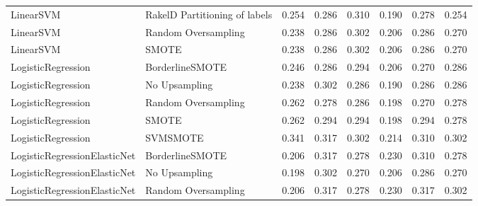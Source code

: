 \begin{tabular}{llllllll}
                      LinearSVM & RakelD Partitioning of labels & 0.254 &                     0.286 &                 0.310 &                  0.190 &                                   0.278 &     0.254 \\
                      LinearSVM &           Random Oversampling & 0.238 &                     0.286 &                 0.302 &                  0.206 &                                   0.286 &     0.270 \\
                      LinearSVM &                         SMOTE & 0.238 &                     0.286 &                 0.302 &                  0.206 &                                   0.286 &     0.270 \\
             LogisticRegression &               BorderlineSMOTE & 0.246 &                     0.286 &                 0.294 &                  0.206 &                                   0.270 &     0.286 \\
             LogisticRegression &                 No Upsampling & 0.238 &                     0.302 &                 0.286 &                  0.190 &                                   0.286 &     0.286 \\
             LogisticRegression &           Random Oversampling & 0.262 &                     0.278 &                 0.286 &                  0.198 &                                   0.270 &     0.278 \\
             LogisticRegression &                         SMOTE & 0.262 &                     0.294 &                 0.294 &                  0.198 &                                   0.294 &     0.278 \\
             LogisticRegression &                      SVMSMOTE & 0.341 &                     0.317 &                 0.302 &                  0.214 &                                   0.310 &     0.302 \\
   LogisticRegressionElasticNet &               BorderlineSMOTE & 0.206 &                     0.317 &                 0.278 &                  0.230 &                                   0.310 &     0.278 \\
   LogisticRegressionElasticNet &                 No Upsampling & 0.198 &                     0.302 &                 0.270 &                  0.206 &                                   0.286 &     0.270 \\
   LogisticRegressionElasticNet &           Random Oversampling & 0.206 &                     0.317 &                 0.278 &                  0.230 &                                   0.317 &     0.302 \\

\end{tabular}
